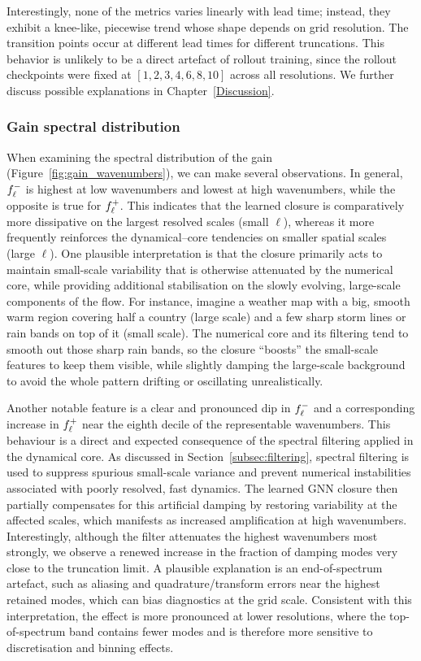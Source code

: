 Interestingly, none of the metrics varies linearly with lead time; instead, they exhibit a knee-like, piecewise trend whose shape depends on grid resolution. The transition points occur at different lead times for different truncations. This behavior is unlikely to be a direct artefact of rollout training, since the rollout checkpoints were fixed at $[1, 2, 3, 4, 6, 8, 10]$ across all resolutions. We further discuss possible explanations in Chapter~\ref{Discussion}.


\subsubsection{Gain spectral distribution}

When examining the spectral distribution of the gain (Figure~\ref{fig:gain_wavenumbers}), we can make several observations. In general, $f^{-}_{\ell}$ is highest at low wavenumbers and lowest at high wavenumbers, while the opposite is true for $f^{+}_{\ell}$. This indicates that the learned closure is comparatively more dissipative on the largest resolved scales (small $\ell$), whereas it more frequently reinforces the dynamical--core tendencies on smaller spatial scales (large $\ell$). One plausible interpretation is that the closure primarily acts to maintain small-scale variability that is otherwise attenuated by the numerical core, while providing additional stabilisation on the slowly evolving, large-scale components of the flow. For instance, imagine a weather map with a big, smooth warm region covering half a country (large scale) and a few sharp storm lines or rain bands on top of it (small scale). The numerical core and its filtering tend to smooth out those sharp rain bands, so the closure “boosts” the small-scale features to keep them visible, while slightly damping the large-scale background to avoid the whole pattern drifting or oscillating unrealistically.

Another notable feature is a clear and pronounced dip in $f^{-}_{\ell}$ and a corresponding increase in $f^{+}_{\ell}$ near the eighth decile of the representable wavenumbers. This behaviour is a direct and expected consequence of the spectral filtering applied in the dynamical core. As discussed in Section~\ref{subsec:filtering}, spectral filtering is used to suppress spurious small-scale variance and prevent numerical instabilities associated with poorly resolved, fast dynamics. The learned GNN closure then partially compensates for this artificial damping by restoring variability at the affected scales, which manifests as increased amplification at high wavenumbers. Interestingly, although the filter attenuates the highest wavenumbers most strongly, we observe a renewed increase in the fraction of damping modes very close to the truncation limit. A plausible explanation is an end-of-spectrum artefact, such as aliasing and quadrature/transform errors near the highest retained modes, which can bias diagnostics at the grid scale. Consistent with this interpretation, the effect is more pronounced at lower resolutions, where the top-of-spectrum band contains fewer modes and is therefore more sensitive to discretisation and binning effects.

